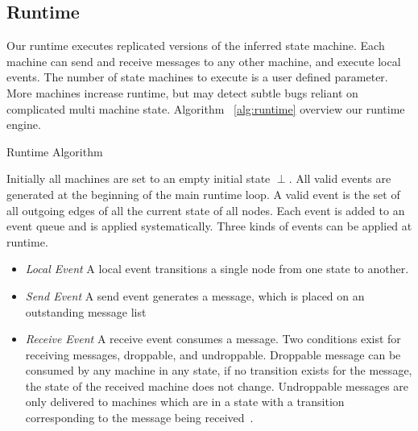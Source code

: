 \subsection{Runtime}

Our runtime executes replicated versions of the inferred state machine.
Each machine can send and receive messages to any other machine, and execute
local events. The number of state machines to execute is a user defined
parameter. More machines increase runtime, but may detect subtle bugs reliant
on complicated multi machine state. Algorithm ~\ref{alg:runtime} overview our
runtime engine.

\begin{algorithm}
    \caption{Runtime Algorithm}
    \label{alg:runtime}
\end{algorithm}

Initially all machines are set to an empty initial state $\perp$. All valid events are
generated at the beginning of the main runtime loop. A valid event is the set
of all outgoing edges of all the current state of all nodes. Each event is
added to an event queue and is applied systematically. Three kinds of events can
be applied at runtime.

\begin{itemize}

    \item\emph{Local Event} A local event transitions a single node from one state to another.

    \item\emph{Send Event} A send event generates a message, which is placed on an outstanding message list

    \item\emph{Receive Event} A receive event consumes a message. Two conditions
        exist for receiving messages, droppable, and undroppable. Droppable
        message can be consumed by any machine in any state, if no transition
        exists for the message, the state of the received machine does not
        change. Undroppable messages are only delivered to machines which are in
        a state with a transition corresponding to the message being
        received~\cite{yang_modist_nsdi09}.

\end{itemize}


